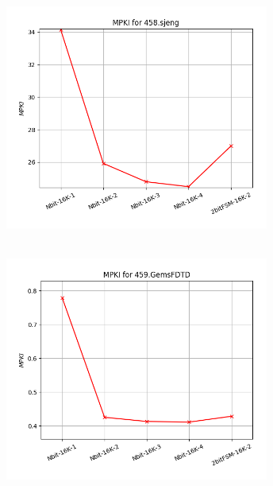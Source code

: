    \begin{minipage}{\textwidth}
      \begin{center}
         \\
         \vspace{3mm}
         \includegraphics[width=0.65\textwidth, frame]{./graphs/4-2i/458-sjeng.png}
         \vspace{6mm}
      \end{center}
   \end{minipage}

   \begin{minipage}{\textwidth}
      \begin{center}
         \\
         \vspace{3mm}
         \includegraphics[width=0.65\textwidth, frame]{./graphs/4-2i/459-GemsFDTD.png}
         \vspace{6mm}
      \end{center}
   \end{minipage}

